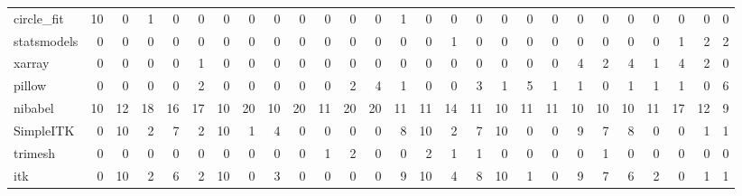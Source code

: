 \begin{tabular}{lrrrrrrrrrrrrrrrrrrrrrrrrrr}
circle\_fit & 10 & 0 & 1 & 0 & 0 & 0 & 0 & 0 & 0 & 0 & 0 & 0 & 1 & 0 & 0 & 0 & 0 & 0 & 0 & 0 & 0 & 0 & 0 & 0 & 0 & 0 \\
statsmodels & 0 & 0 & 0 & 0 & 0 & 0 & 0 & 0 & 0 & 0 & 0 & 0 & 0 & 0 & 1 & 0 & 0 & 0 & 0 & 0 & 0 & 0 & 0 & 1 & 2 & 2 \\
xarray & 0 & 0 & 0 & 0 & 1 & 0 & 0 & 0 & 0 & 0 & 0 & 0 & 0 & 0 & 0 & 0 & 0 & 0 & 0 & 4 & 2 & 4 & 1 & 4 & 2 & 0 \\
pillow & 0 & 0 & 0 & 0 & 2 & 0 & 0 & 0 & 0 & 0 & 2 & 4 & 1 & 0 & 0 & 3 & 1 & 5 & 1 & 1 & 0 & 1 & 1 & 1 & 0 & 6 \\
nibabel & 10 & 12 & 18 & 16 & 17 & 10 & 20 & 10 & 20 & 11 & 20 & 20 & 11 & 11 & 14 & 11 & 10 & 11 & 11 & 10 & 10 & 10 & 11 & 17 & 12 & 9 \\
SimpleITK & 0 & 10 & 2 & 7 & 2 & 10 & 1 & 4 & 0 & 0 & 0 & 0 & 8 & 10 & 2 & 7 & 10 & 0 & 0 & 9 & 7 & 8 & 0 & 0 & 1 & 1 \\
trimesh & 0 & 0 & 0 & 0 & 0 & 0 & 0 & 0 & 0 & 1 & 2 & 0 & 0 & 2 & 1 & 1 & 0 & 0 & 0 & 0 & 1 & 0 & 0 & 0 & 0 & 0 \\
itk & 0 & 10 & 2 & 6 & 2 & 10 & 0 & 3 & 0 & 0 & 0 & 0 & 9 & 10 & 4 & 8 & 10 & 1 & 0 & 9 & 7 & 6 & 2 & 0 & 1 & 1 \\
\bottomrule
\end{tabular}

